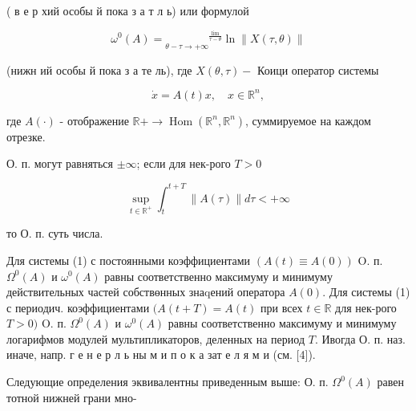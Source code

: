 \documentclass[10pt]{article}
\begin{document}
( в е р хий особы й пока з а т л ь) или формулой



\[

\omega^{0}(A)={\underset{\theta-\tau \rightarrow+\infty}{ }}^{\frac{\lim }{\tau-\theta}} \ln \|X(\tau, \theta)\|

\]



(нижн ий особы й пока з а те ль), где $X(\theta, \tau)-$ Коици оператор системы



\[

\dot{x}=A(t) x, \quad x \in \mathbb{R}^{n},

\]



где $A(\cdot)$ - отображение $\mathbb{R}+\rightarrow \operatorname{Hom}\left(\mathbb{R}^{n}, \mathbb{R}^{n}\right)$, суммируемое на каждом отрезке.



О. п. могут равняться $\pm \infty$; если для нек-рого $T>0$



\[

\sup _{t \in \mathbb{R}^{+}} \int_{t}^{t+T}\|A(\tau)\| d \tau<+\infty

\]



то О. п. суть числа.



Для системы (1) с постоянными коэффициентами $(A(t) \equiv A(0))$ O. п. $\Omega^{0}(A)$ и $\omega^{0}(A)$ равны соответственно максимуму и минимуму действительных частей собствөнных знаqений оператора $A(0)$. Для системы (1) с периодич. коэффициентами $(A(t+T)=A(t)$ при всех $t \in \mathbb{R}$ для нек-рого $T>0)$ O. п. $\Omega^{0}(A)$ и $\omega^{0}(A)$ равны соответственно максимуму и минимуму логарифмов модулей мультипликаторов, деленных на период $T$. Ивогда О. п. наз. иначе, напр. г е н е р л ь ны м и п о к а зат е л я м и (см. [4]).



Следующие определения эквивалентны приведенным выше: О. п. $\Omega^{0}(A)$ равен тотной нижней грани мно-
\end{document}
